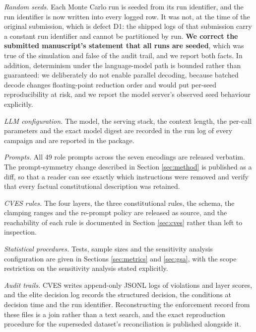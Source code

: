 \documentclass{ieeeaccess}
\newif\ifpendingvisible
\newcommand{\todo}[1]{%
  \ifpendingvisible\textcolor{red}{\textbf{[\MakeUppercase{#1}]}}\fi}
\begin{document}
\emph{Random seeds.} Each Monte Carlo run is seeded from its run
identifier, and the run identifier is now written into every logged row.
It was not, at the time of the original submission, which is defect D1:
the shipped logs of that submission carry a constant run identifier and
cannot be partitioned by run. \textbf{We correct the submitted
manuscript's statement that all runs are seeded}, which was true of the
simulation and false of the audit trail, and we report both facts. In
addition, determinism under the language-model path is bounded rather
than guaranteed: we deliberately do not enable parallel decoding,
because batched decode changes floating-point reduction order and would
put per-seed reproducibility at risk, and we report the model server's
observed seed behaviour explicitly.
\todo{PENDING: the determinism check result, one run identifier executed
twice with the decision logs diffed ignoring timestamps.}

\emph{LLM configuration.} The model, the serving stack, the context
length, the per-call parameters and the exact model digest are recorded
in the run log of every campaign and are reported in the package.
\todo{PENDING CAMPAIGN: model digest, server version, context length and
measured per-call latency of the campaign pod.}

\emph{Prompts.} All 49 role prompts across the seven encodings are
released verbatim. The prompt-symmetry change described in Section
\ref{sec:method} is published as a diff, so that a reader can see
exactly which instructions were removed and verify that every factual
constitutional description was retained.

\emph{CVES rules.} The four layers, the three constitutional rules, the
schema, the clamping ranges and the re-prompt policy are released as
source, and the reachability of each rule is documented in Section
\ref{sec:cves} rather than left to inspection.

\emph{Statistical procedures.} Tests, sample sizes and the sensitivity
analysis configuration are given in Sections \ref{sec:metrics} and
\ref{sec:gsa}, with the scope restriction on the sensitivity analysis
stated explicitly.

\emph{Audit trails.} CVES writes append-only JSONL logs of violations
and layer scores, and the elite decision log records the structured
decision, the conditions at decision time and the run identifier.
Reconstructing the enforcement record from these files is a join rather
than a text search, and the exact reproduction procedure for the
superseded dataset's reconciliation is published alongside it.
\end{document}
